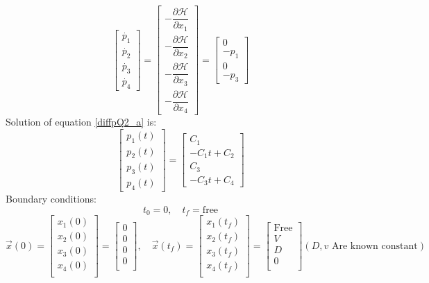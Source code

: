 \begin{equation}\label{diffpQ2_a}
	\begin{bmatrix}
		\dot{p_1}\\
		\dot{p_2}\\
		\dot{p_3}\\
		\dot{p_4}
	\end{bmatrix} = \begin{bmatrix}
		-\dfrac{\partial \mathcal{H}}{\partial x_1} \\[10 pt]
		-\dfrac{\partial \mathcal{H}}{\partial x_2} \\[10 pt]
		-\dfrac{\partial \mathcal{H}}{\partial x_3} \\[10 pt]
		-\dfrac{\partial \mathcal{H}}{\partial x_4} 
	\end{bmatrix} = \begin{bmatrix}
		0 \\
		-p_1\\
		0\\
		-p_3
	\end{bmatrix}
\end{equation} 
Solution of equation \ref{diffpQ2_a} is:
\begin{equation}\label{SolvepQ2_a}
	\begin{bmatrix}
		p_1(t)\\
		p_2(t)\\
		p_3(t)\\
		p_4(t)
	\end{bmatrix} = \begin{bmatrix}
	C_1\\
	-C_1t+C_2\\
	C_3\\
	-C_3t+C_4
\end{bmatrix} 
\end{equation}
Boundary conditions:
$$t_0 = 0,\quad t_f = \text{free}$$
$$\vec{x}(0) = \begin{bmatrix}
	x_1(0) \\
	x_2(0) \\
	x_3(0) \\
	x_4(0) \\
\end{bmatrix}= \begin{bmatrix}
0 \\
0 \\
0 \\
0 \\
\end{bmatrix}, \quad
\vec{x}(t_f) = \begin{bmatrix}
	x_1(t_f) \\
	x_2(t_f) \\
	x_3(t_f) \\
	x_4(t_f) \\
\end{bmatrix}= \begin{bmatrix}
	\text{Free} \\
	V \\
	D \\
	0 \\
\end{bmatrix}
(D, v \text{ Are known constant})$$

